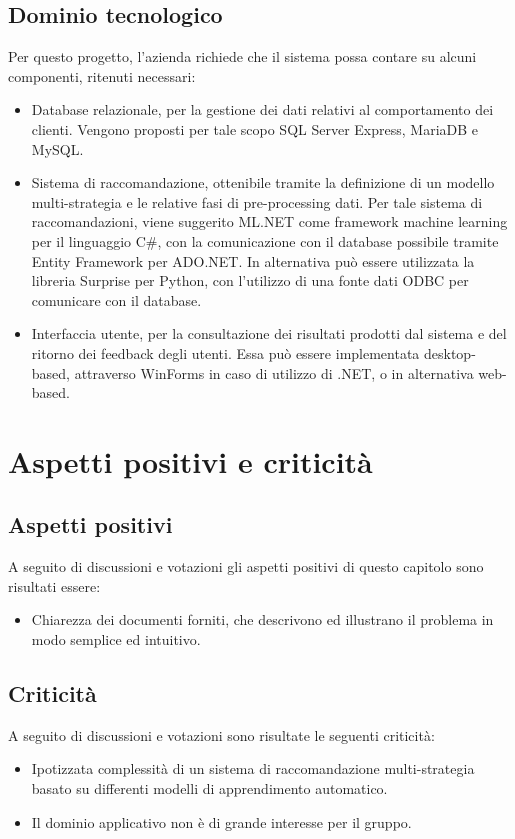 \documentclass[12pt]{report}
\begin{document}
\subsection{Dominio tecnologico}
Per questo progetto, l'azienda richiede che il sistema possa contare su alcuni componenti, ritenuti necessari:
\begin{itemize}
    \item Database relazionale, per la gestione dei dati relativi al comportamento dei clienti. Vengono proposti per tale scopo SQL Server Express, MariaDB e MySQL.
    \item Sistema di raccomandazione, ottenibile tramite la definizione di un modello multi-strategia e le relative fasi di pre-processing dati. Per tale sistema di raccomandazioni, viene suggerito ML.NET come framework machine learning per il linguaggio C\#, con la comunicazione con il database possibile tramite Entity Framework per ADO.NET. In alternativa può essere utilizzata la libreria Surprise per Python, con l'utilizzo di una fonte dati ODBC per comunicare con il database.
    \item Interfaccia utente, per la consultazione dei risultati prodotti dal sistema e del ritorno dei feedback degli utenti. Essa può essere implementata desktop-based, attraverso WinForms in caso di utilizzo di .NET, o in alternativa web-based.
\end{itemize}

\section{Aspetti positivi e criticità}
\subsection{Aspetti positivi}
A seguito di discussioni e votazioni gli aspetti positivi di questo capitolo sono risultati essere:
\begin{itemize}
    \item Chiarezza dei documenti forniti, che descrivono ed illustrano il problema in modo semplice ed intuitivo.
\end{itemize}

\subsection{Criticità}
A seguito di discussioni e votazioni sono risultate le seguenti criticità:
\begin{itemize}
    \item Ipotizzata complessità di un sistema di raccomandazione multi-strategia basato su differenti modelli di apprendimento automatico.
    \item Il dominio applicativo non è di grande interesse per il gruppo.
\end{itemize}
\end{document}

